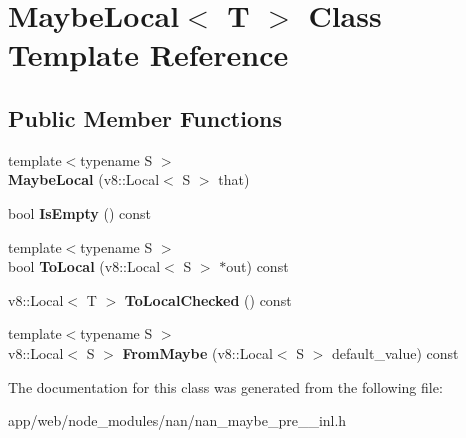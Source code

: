 \hypertarget{class_maybe_local}{}\section{Maybe\+Local$<$ T $>$ Class Template Reference}
\label{class_maybe_local}
\subsection*{Public Member Functions}
\begin{DoxyCompactItemize}
\item 
\mbox{\label{class_maybe_local_a3761d52d2375a4f62dbc78827a69e926}} 
{\footnotesize template$<$typename S $>$ }\\{\bfseries Maybe\+Local} (v8\+::\+Local$<$ S $>$ that)
\item 
\mbox{\label{class_maybe_local_a42b3f2ce44f2bd4110e6701a4eabc3b7}} 
bool {\bfseries Is\+Empty} () const
\item 
\mbox{\label{class_maybe_local_a8fb6705988904e7b24f06ac381c4132b}} 
{\footnotesize template$<$typename S $>$ }\\bool {\bfseries To\+Local} (v8\+::\+Local$<$ S $>$ $\ast$out) const
\item 
\mbox{\label{class_maybe_local_ade5b5e68af0d3178bd22818f92218b48}} 
v8\+::\+Local$<$ T $>$ {\bfseries To\+Local\+Checked} () const
\item 
\mbox{\label{class_maybe_local_a74bdc48ef14b2ad688226ea85200e603}} 
{\footnotesize template$<$typename S $>$ }\\v8\+::\+Local$<$ S $>$ {\bfseries From\+Maybe} (v8\+::\+Local$<$ S $>$ default\+\_\+value) const
\end{DoxyCompactItemize}


The documentation for this class was generated from the following file\+:\begin{DoxyCompactItemize}
\item 
app/web/node\+\_\+modules/nan/nan\+\_\+maybe\+\_\+pre\+\_\+\_\+inl.\+h\end{DoxyCompactItemize}
